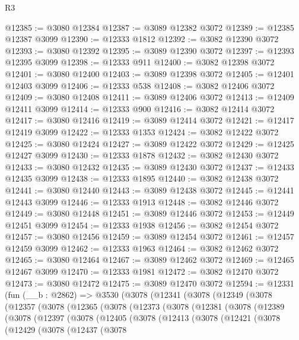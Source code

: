 \begin{lexlean}{R3}
\begin{coremodule}
@12385 := @3080 @12384
@12387 := @3089 @12382 @3072
@12389 := @12385 @12387 @3099
@12390 := @12333 @1812
@12392 := @3082 @12390 @3072
@12393 := @3080 @12392
@12395 := @3089 @12390 @3072
@12397 := @12393 @12395 @3099
@12398 := @12333 @911
@12400 := @3082 @12398 @3072
@12401 := @3080 @12400
@12403 := @3089 @12398 @3072
@12405 := @12401 @12403 @3099
@12406 := @12333 @538
@12408 := @3082 @12406 @3072
@12409 := @3080 @12408
@12411 := @3089 @12406 @3072
@12413 := @12409 @12411 @3099
@12414 := @12333 @900
@12416 := @3082 @12414 @3072
@12417 := @3080 @12416
@12419 := @3089 @12414 @3072
@12421 := @12417 @12419 @3099
@12422 := @12333 @1353
@12424 := @3082 @12422 @3072
@12425 := @3080 @12424
@12427 := @3089 @12422 @3072
@12429 := @12425 @12427 @3099
@12430 := @12333 @1878
@12432 := @3082 @12430 @3072
@12433 := @3080 @12432
@12435 := @3089 @12430 @3072
@12437 := @12433 @12435 @3099
@12438 := @12333 @1895
@12440 := @3082 @12438 @3072
@12441 := @3080 @12440
@12443 := @3089 @12438 @3072
@12445 := @12441 @12443 @3099
@12446 := @12333 @1913
@12448 := @3082 @12446 @3072
@12449 := @3080 @12448
@12451 := @3089 @12446 @3072
@12453 := @12449 @12451 @3099
@12454 := @12333 @1938
@12456 := @3082 @12454 @3072
@12457 := @3080 @12456
@12459 := @3089 @12454 @3072
@12461 := @12457 @12459 @3099
@12462 := @12333 @1963
@12464 := @3082 @12462 @3072
@12465 := @3080 @12464
@12467 := @3089 @12462 @3072
@12469 := @12465 @12467 @3099
@12470 := @12333 @1981
@12472 := @3082 @12470 @3072
@12473 := @3080 @12472
@12475 := @3089 @12470 @3072
@12594 := @12331
    (fun (__b : @2862) =>
    @3530
      (@3078
        (@12341
          (@3078
            (@12349
              (@3078
                (@12357
                  (@3078
                    (@12365
                      (@3078
                        (@12373
                          (@3078
                            (@12381
                              (@3078
                                (@12389
                                  (@3078
                                    (@12397
                                      (@3078
                                        (@12405
                                          (@3078
                                            (@12413
                                              (@3078
                                                (@12421
                                                  (@3078
                                                    (@12429
                                                      (@3078
                                                        (@12437
                                                          (@3078

\end{coremodule}
\end{lexlean}
